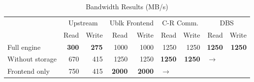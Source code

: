 \begin{table*}[tb]
\centering
\caption{Bandwidth Results (MB/s)}
\label{tab:bandwidth}
\begin{tabular}{|l|r|r|r|r|r|r|r|r|} 
\hline
\multirow{2}{*}{}   & \multicolumn{2}{c|}{Upstream} & \multicolumn{2}{c|}{Ublk Frontend} & \multicolumn{2}{c|}{C-R Comm.} & \multicolumn{2}{c|}{DBS} \\
\cline{2-9}
                & Read & Write                      & Read & Write                      & Read & Write                      & Read & Write \\ 
\hline
Full engine     & \textbf{300}  & \textbf{275}      & 1000 & 1000                       & 1250 & 1250                       & \textbf{1250}& \textbf{1250} \\ 
\hline
Without storage & 670  & 415                        & 1250 & 1250                       & \textbf{1250}  & \textbf{1250}    & \multicolumn{2}{l|}{$\rightarrow$} \\ 
\hline
Frontend only   & 750  & 415                        & \textbf{2000} & \textbf{2000}     & \multicolumn{4}{l|}{$\rightarrow$} \\
\hline
\end{tabular}
\end{table*}

